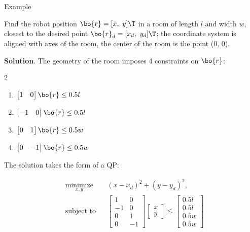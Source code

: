 \documentclass{beamer}
\begin{document}
\begin{frame}{Example}
	\begin{flushleft}
		
		Find the robot position $\bo{r} = [x, \ y]\T$ in a room of length $l$ and width $w$, closest to the desired point $\bo{r}_d= [x_d, \ y_d]\T$; the coordinate system is aligned with axes of the room, the center of the room is the point (0, 0).
		
		\bigskip
		
		\hspace{-0.2in}
		\textbf{Solution}. The geometry of the room imposes 4 constraints on $\bo{r}$:
		
		\begin{multicols}{2}
		\begin{enumerate}
			\item $\begin{bmatrix} 1 & 0 \end{bmatrix} \bo{r} \leq 0.5 l$
			\item $\begin{bmatrix} -1 & 0 \end{bmatrix}  \bo{r} \leq 0.5 l$
			\item $\begin{bmatrix} 0 & 1 \end{bmatrix}  \bo{r} \leq 0.5 w$
			\item $\begin{bmatrix} 0 & -1 \end{bmatrix}  \bo{r} \leq 0.5 w$
		\end{enumerate}
	\end{multicols}
		
		The solution takes the form of a QP:
		
		\begin{equation}
			\begin{aligned}
				& \underset{x, y}{\text{minimize}}
				& & (x-x_d)^2 + (y-y_d)^2, \\
				& \text{subject to}
				& & \begin{bmatrix} 1 & 0 \\ -1 & 0 \\ 0 & 1 \\ 0 & -1 \end{bmatrix}
				\begin{bmatrix} x \\ y \end{bmatrix}
				\leq
				\begin{bmatrix} 0.5 l \\ 0.5 l \\ 0.5 w \\ 0.5 w \end{bmatrix}
			\end{aligned}
		\end{equation}
		
	\end{flushleft}
\end{frame}
\end{document}
